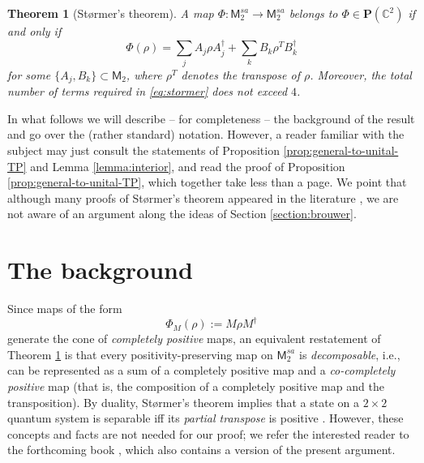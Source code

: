 \documentclass[10pt]{article}
\newcommand{\cP}{\bm{P}}
\newcommand{\C}{\mathbb{C}}
\newcommand{\cM}{\mathsf{M}}
\theoremstyle{plain}
\newtheorem{theorem}{Theorem}%
\theoremstyle{definition}
\theoremstyle{remark}
\begin{document}
 \begin{theorem} [St{\o}rmer's theorem] \label{theorem:stormer}
A map $\Phi : \cM_2^{sa} \to \cM_2^{sa}$ belongs to $\Phi \in \cP(\C^2)$ if and only if 
\begin{equation} \label{eq:stormer}
\Phi(\rho)  = \sum_j A_j\rho A_j^\dagger+\sum_k B_k\rho^T B_k^\dagger
\end{equation}
 for some $\{A_j,B_k\}\subset\cM_2$, where $\rho^T$ denotes the transpose of $\rho$. Moreover, the total number of terms required in \eqref{eq:stormer} does not exceed $4$. 
\end{theorem}  
In what follows we will describe -- for completeness -- the background of the result and go over the (rather standard) notation.  
However,  a reader familiar with the subject may just consult the statements of Proposition \ref{prop:general-to-unital-TP} 
and Lemma \ref{lemma:interior}, and read the proof of Proposition \ref{prop:general-to-unital-TP}, which together 
take less than a page. {We point that although many proofs of St{\o}rmer's theorem appeared in the literature \cite{KCKL00,VDM01,LMO06,KSW09}, 
we are not aware of an argument along the ideas of Section \ref{section:brouwer}}.

\section{The background} 

Since maps of the form 
\begin{equation}  \label{eq:PhiM}
\Phi_M(\rho) := M\rho M^\dagger
\end{equation}
 generate the cone of {\em completely positive} maps, an equivalent restatement of Theorem \ref{theorem:stormer} is that every positivity-preserving map on $\cM_2^{sa}$ is 
{\em decomposable}, i.e., 
can be represented as a sum of a completely positive map and a {\em co-completely positive} map 
(that is, the composition of a completely positive map and the transposition).  
By duality, St{\o}rmer's theorem implies that a state on a $2 \times 2$ quantum system is separable 
iff its {\em partial transpose} is positive \cite{HHH96}. 
However, these concepts and facts are not needed for our proof; we refer the interested reader to 
the forthcoming book \cite{book}, which also contains a version of the present argument. 
\end{document}
